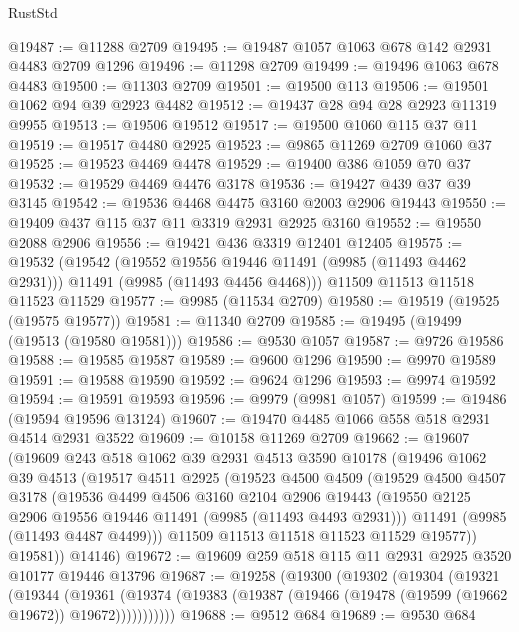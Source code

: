 \begin{lexlean}{RustStd}
\begin{coremodule}
@19487 := @11288 @2709
@19495 := @19487 @1057 @1063 @678 @142 @2931 @4483 @2709 @1296
@19496 := @11298 @2709
@19499 := @19496 @1063 @678 @4483
@19500 := @11303 @2709
@19501 := @19500 @113
@19506 := @19501 @1062 @94 @39 @2923 @4482
@19512 := @19437 @28 @94 @28 @2923 @11319 @9955
@19513 := @19506 @19512
@19517 := @19500 @1060 @115 @37 @11
@19519 := @19517 @4480 @2925
@19523 := @9865 @11269 @2709 @1060 @37
@19525 := @19523 @4469 @4478
@19529 := @19400 @386 @1059 @70 @37
@19532 := @19529 @4469 @4476 @3178
@19536 := @19427 @439 @37 @39 @3145
@19542 := @19536 @4468 @4475 @3160 @2003 @2906 @19443
@19550 := @19409 @437 @115 @37 @11 @3319 @2931 @2925 @3160
@19552 := @19550 @2088 @2906
@19556 := @19421 @436 @3319 @12401 @12405
@19575 := @19532
    (@19542
      (@19552 @19556 @19446 @11491 (@9985 (@11493 @4462 @2931)))
      @11491
      (@9985 (@11493 @4456 @4468)))
    @11509
    @11513
    @11518
    @11523
    @11529
@19577 := @9985 (@11534 @2709)
@19580 := @19519 (@19525 (@19575 @19577))
@19581 := @11340 @2709
@19585 := @19495 (@19499 (@19513 (@19580 @19581)))
@19586 := @9530 @1057
@19587 := @9726 @19586
@19588 := @19585 @19587
@19589 := @9600 @1296
@19590 := @9970 @19589
@19591 := @19588 @19590
@19592 := @9624 @1296
@19593 := @9974 @19592
@19594 := @19591 @19593
@19596 := @9979 (@9981 @1057)
@19599 := @19486 (@19594 @19596 @13124)
@19607 := @19470 @4485 @1066 @558 @518 @2931 @4514 @2931 @3522
@19609 := @10158 @11269 @2709
@19662 := @19607
    (@19609
      @243
      @518
      @1062
      @39
      @2931
      @4513
      @3590
      @10178
      (@19496
        @1062
        @39
        @4513
        (@19517
          @4511
          @2925
          (@19523
            @4500
            @4509
            (@19529
              @4500
              @4507
              @3178
              (@19536
                @4499
                @4506
                @3160
                @2104
                @2906
                @19443
                (@19550 @2125 @2906 @19556 @19446 @11491 (@9985 (@11493 @4493 @2931)))
                @11491
                (@9985 (@11493 @4487 @4499)))
              @11509
              @11513
              @11518
              @11523
              @11529
              @19577))
          @19581))
      @14146)
@19672 := @19609 @259 @518 @115 @11 @2931 @2925 @3520 @10177 @19446 @13796
@19687 := @19258
    (@19300
      (@19302
        (@19304
          (@19321
            (@19344
              (@19361
                (@19374 (@19383 (@19387 (@19466 (@19478 (@19599 (@19662 @19672)) @19672)))))))))))
@19688 := @9512 @684
@19689 := @9530 @684

\end{coremodule}
\end{lexlean}
